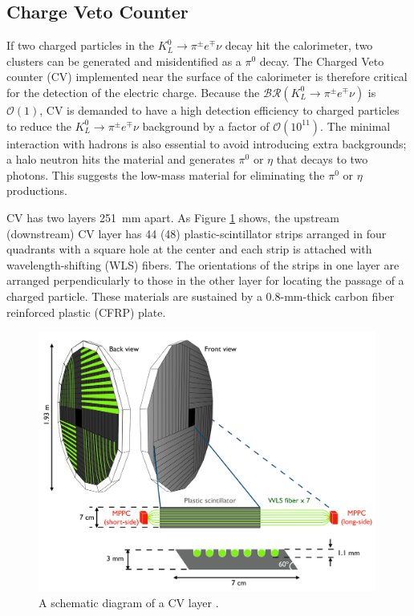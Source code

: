  

\subsection{Charge Veto Counter}
If two charged particles in the ${K_L^0 \to \pi^{\pm} e^{\mp} \nu}$ decay hit the calorimeter, two clusters can be generated and misidentified as a $\pi^0$ decay. The Charged Veto counter (CV) \parencite{CV} implemented near the surface of the calorimeter is therefore critical for the detection of the electric charge. Because the ${\mathcal{BR}(K_L^0 \to \pi^{\pm} e^{\mp} \nu)}$ is $\mathcal{O}(1)$, CV is demanded to have a high detection efficiency to charged particles to reduce the ${K_L^0 \to \pi^{\pm} e^{\mp} \nu}$ background by a factor of $\mathcal{O}(10^{11})$. The minimal interaction with hadrons is also essential to avoid introducing extra backgrounds; a halo neutron hits the material and generates $\pi^0$ or $\eta$ that decays to two photons. This suggests the low-mass material for eliminating the $\pi^0$ or $\eta$ productions. 

CV has two layers 251~mm apart. As Figure \ref{fig:CV_config} shows, the upstream (downstream) CV layer has 44 (48) plastic-scintillator strips arranged in four quadrants with a square hole at the center and each strip is attached with wavelength-shifting (WLS) fibers. The orientations of the strips in one layer are arranged perpendicularly to those in the other layer for locating the passage of a charged particle. These materials are sustained by a 0.8-mm-thick carbon fiber reinforced plastic (CFRP) plate.

\begin{figure}[h]
\begin{center}
\captionsetup{width=.99\linewidth}
\includegraphics[width=0.99\textwidth]{Figures/Chapter3/CV_config.pdf}
\caption{A schematic diagram of a CV layer \parencite{CV, Maeda}.}
\label{fig:CV_config}
\end{center}
\end{figure}

